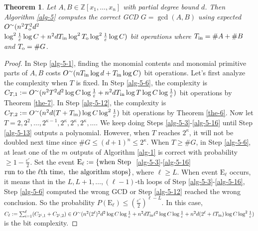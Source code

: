 \documentclass[final,20pt]{elsarticle}
\newtheorem{theorem}{Theorem}[section]
\def\Z{{\mathbb Z}}
\def\inp{{\rm{in}}}
\def\out{{\rm{o}}}
\begin{document}
\begin{theorem}
\label{th-11}
Let $A,B\in \Z[x_1,\dots,x_n]$ with partial degree bound $d$.
Then Algorithm \ref{alg-5} computes the correct GCD $G=\gcd(A,B)$ using expected $O^\sim(n^2T_{\out}^2d^2$\\$\log^2 \frac{1}{\varepsilon}\log C+n^2dT_{\inp}\log^2 T_{\out}\log^2\frac{1}{\varepsilon}\log C)$ bit operations where $T_{\inp}=\#A+\#B$ and $T_{\out}=\#G$.
\end{theorem}
%
\begin{proof}
In Step \ref{alg-5-1}, finding the monomial contents and monomial primitive parts of $A,B$ costs $O^\sim(nT_{\inp}\log d+T_{\inp}\log C)$ bit operations.
%
Let's first analyze the complexity when $T$ is fixed. In Step \ref{alg-5-6},
the complexity is $C_{T,1}:=O^\sim(n^2T^2d^2\log C\log\frac{1}{\varepsilon}+n^2dT_{\inp}\log T\log C\log\frac{1}{\varepsilon})$ bit operations by Theorem \ref{the-7}. In Step \ref{alg-5-12}, the complexity is $C_{T,2}:=O^\sim(n^2d(T+T_{\inp})\log C\log^2\frac{1}{\varepsilon})$ bit operations by Theorem \ref{the-6}.
%
Now let $T=2,2^2,\dots,2^{\kappa-1},2^{\kappa},2^{\kappa},2^{\kappa},\dots$. We keep doing Steps \ref{alg-5-3}-\ref{alg-5-16} until Step \ref{alg-5-13}
outputs a polynomial. However, when $T$ reaches $2^{\kappa}$, it will not be doubled next time since  $\#G\leq (d+1)^n\leq 2^{\kappa}$.
%
When $T\geq \#G$, in Step \ref{alg-5-6}, at least one of the $m$ outputs of Algorithm \ref{alg-1} is correct with probability $\geq1-\frac{\varepsilon'}{2}$. Set the event
%
$\mathrm{E}_{\ell}:=\{ {\rm when\ Step\ }$ \ref{alg-5-3}-\ref{alg-5-16} ${\rm run\ to\  the\ } \ell {\rm th\  time,\ the\ algorithm\ stops}\}$,
where $\ell\geq L$.
%
When event $\mathrm{E}_{\ell}$ occurs, it means that in the $L,L+1,\dots,(\ell-1)$-th loops of Step \ref{alg-5-3}-\ref{alg-5-16}, Step \ref{alg-5-6} computed the wrong GCD or Step \ref{alg-5-12} reached the wrong conclusion. So the probability $P(\mathrm{E}_{\ell})\leq
(\frac{\varepsilon'}{2})^{\ell-L}$. In this case,
%
$C_{\ell}:=\sum_{i=1}^{\ell}(C_{2^i,1}+C_{2^i,2})\in O^\sim(n^2(2^{\ell})^2d^2\log C\log\frac{1}{\varepsilon}+n^2dT_{\inp}{\ell}^2\log C\log\frac{1}{\varepsilon}+n^2d(2^{\ell}+\ell T_{\inp})\log C\log^2\frac{1}{\varepsilon})$ is the bit complexity.


\end{proof}
\end{document}
